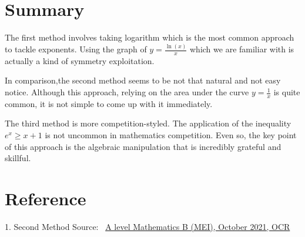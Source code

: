 \documentclass{article}
\begin{document}
\section{Summary}
The first method involves taking logarithm which is the most common approach to tackle exponents. Using the graph of $y = \frac{\ln(x)}{x}$ which we are familiar with is actually a kind of symmetry exploitation.  

In comparison,the second method seems to be not that natural and not easy notice. Although this approach, relying on the area under the curve $y = \frac{1}{x}$ is quite common, it is not simple to come up with it immediately.

The third method is more competition-styled. The application of the inequality $e^x \ge x+1$ is not uncommon in mathematics competition. Even so, the key point of this approach is the algebraic manipulation that is incredibly grateful and skillful.

\section{Reference}
1. Second Method Source: \ \href{https://pmt.physicsandmathstutor.com/download/Maths/A-level/Papers/OCR-MEI/Paper-3/IN/Nov%202020%20IN.pdf}{A level Mathematics B (MEI), October 2021, OCR}
\end{document}
